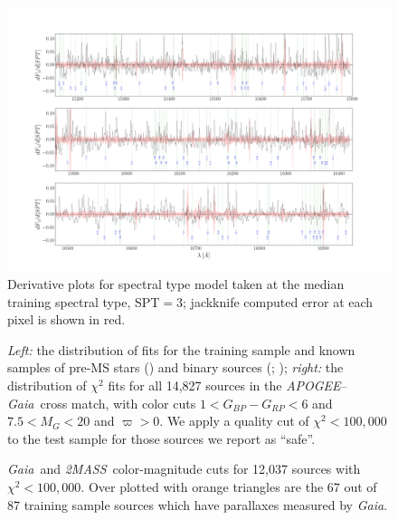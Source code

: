 \documentclass[modern]{aastex62}
\newcommand{\apogee}{\textsl{APOGEE}}
\newcommand{\gaia}{\textsl{Gaia}}
\newcommand{\zmass}{\textsl{2MASS}}
\begin{document}
\begin{figure}[ht]
	\begin{center}
	\includegraphics[width=16cm]{figures/derivative_jackknife_spt.png}
	\end{center}
	\caption{Derivative plots for spectral type model taken at the median training spectral type, SPT$=3$; jackknife computed error at each pixel is shown in red.} \label{fig:west_derivative}
\end{figure}

\begin{figure}[ht]
	\caption{\textit{Left:} the distribution of fits for the training sample and known samples of pre-MS stars (\citealt{Cottaar:2014}) and binary sources (\citealt{ElBadry:2018}; \citealt{Skinner:2018}); \textit{right:} the distribution of $\chi^2$ fits for all 14,827 sources in the \apogee --\gaia\ cross match, with color cuts $1<G_{BP}-G_{RP}<6$ and $7.5<M_{G}<20$ and $\varpi>0$. We apply a quality cut of $\chi^2 < 100,000$ to the test sample for those sources we report as ``safe''. \label{fig:chi_dist}}
\end{figure}

\begin{figure}[ht]
	\caption{\gaia\ and \zmass\ color-magnitude cuts for 12,037 sources with $\chi^2<100,000$. Over plotted with orange triangles are the 67 out of 87 training sample sources which have parallaxes measured by \gaia. \label{fig:cmd_selection}}
\end{figure}
\end{document}

